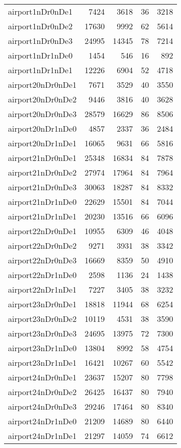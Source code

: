 \begin{longtable}{lrrrr}
airport1nDr0nDe1 & 7424 & 3618 & 36 & 3218 \\
airport1nDr0nDe2 & 17630 & 9992 & 62 & 5614 \\
airport1nDr0nDe3 & 24995 & 14345 & 78 & 7214 \\
airport1nDr1nDe0 & 1454 & 546 & 16 & 892 \\
airport1nDr1nDe1 & 12226 & 6904 & 52 & 4718 \\
airport20nDr0nDe1 & 7671 & 3529 & 40 & 3550 \\
airport20nDr0nDe2 & 9446 & 3816 & 40 & 3628 \\
airport20nDr0nDe3 & 28579 & 16629 & 86 & 8506 \\
airport20nDr1nDe0 & 4857 & 2337 & 36 & 2484 \\
airport20nDr1nDe1 & 16065 & 9631 & 66 & 5816 \\
airport21nDr0nDe1 & 25348 & 16834 & 84 & 7878 \\
airport21nDr0nDe2 & 27974 & 17964 & 84 & 7964 \\
airport21nDr0nDe3 & 30063 & 18287 & 84 & 8332 \\
airport21nDr1nDe0 & 22629 & 15501 & 84 & 7044 \\
airport21nDr1nDe1 & 20230 & 13516 & 66 & 6096 \\
airport22nDr0nDe1 & 10955 & 6309 & 46 & 4048 \\
airport22nDr0nDe2 & 9271 & 3931 & 38 & 3342 \\
airport22nDr0nDe3 & 16669 & 8359 & 50 & 4910 \\
airport22nDr1nDe0 & 2598 & 1136 & 24 & 1438 \\
airport22nDr1nDe1 & 7227 & 3405 & 38 & 3232 \\
airport23nDr0nDe1 & 18818 & 11944 & 68 & 6254 \\
airport23nDr0nDe2 & 10119 & 4531 & 38 & 3590 \\
airport23nDr0nDe3 & 24695 & 13975 & 72 & 7300 \\
airport23nDr1nDe0 & 13804 & 8992 & 58 & 4754 \\
airport23nDr1nDe1 & 16421 & 10267 & 60 & 5542 \\
airport24nDr0nDe1 & 23637 & 15207 & 80 & 7798 \\
airport24nDr0nDe2 & 26425 & 16437 & 80 & 7940 \\
airport24nDr0nDe3 & 29246 & 17464 & 80 & 8340 \\
airport24nDr1nDe0 & 21209 & 14689 & 80 & 6440 \\
airport24nDr1nDe1 & 21297 & 14059 & 74 & 6612 \\

\end{longtable}
